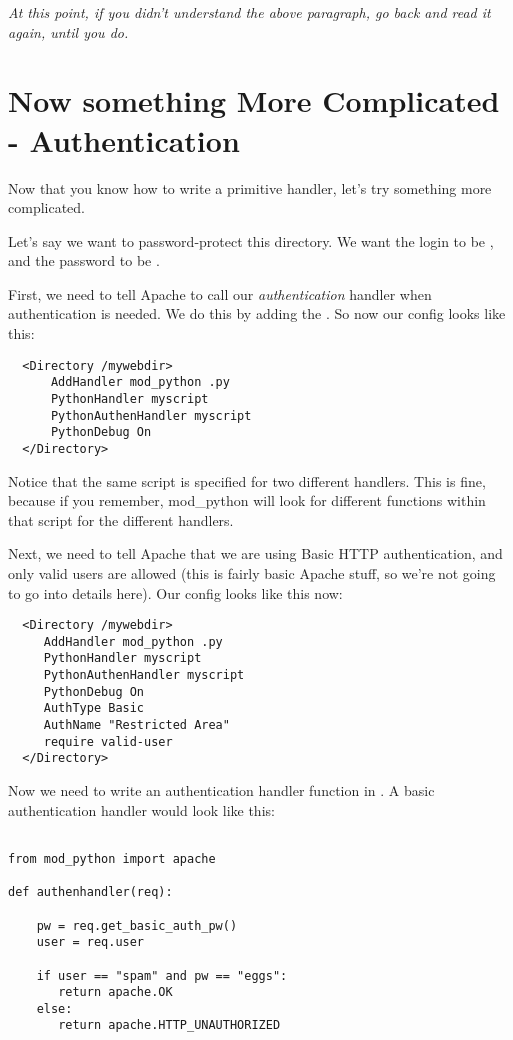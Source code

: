 \emph{At this point, if you didn't understand the above paragraph, go
  back and read it again, until you do.}

\section{Now something More Complicated - Authentication\label{tut-more-complicated}}

Now that you know how to write a primitive handler, let's try
something more complicated.

Let's say we want to password-protect this directory. We want the
login to be , and the password to be .

First, we need to tell Apache to call our \emph{authentication}
handler when authentication is needed. We do this by adding the
. So now our config looks like this:

\begin{verbatim}
  <Directory /mywebdir>
      AddHandler mod_python .py
      PythonHandler myscript
      PythonAuthenHandler myscript
      PythonDebug On
  </Directory>
\end{verbatim}

Notice that the same script is specified for two different
handlers. This is fine, because if you remember, mod_python will look
for different functions within that script for the different handlers.

Next, we need to tell Apache that we are using Basic HTTP
authentication, and only valid users are allowed (this is fairly basic
Apache stuff, so we're not going to go into details here). Our config
looks like this now:

\begin{verbatim}
  <Directory /mywebdir>
     AddHandler mod_python .py
     PythonHandler myscript
     PythonAuthenHandler myscript
     PythonDebug On
     AuthType Basic
     AuthName "Restricted Area"
     require valid-user
  </Directory>
\end{verbatim}          

Now we need to write an authentication handler function in
. A basic authentication handler would look like
this:

\begin{verbatim}

from mod_python import apache

def authenhandler(req):

    pw = req.get_basic_auth_pw()
    user = req.user

    if user == "spam" and pw == "eggs":
       return apache.OK
    else:
       return apache.HTTP_UNAUTHORIZED
\end{verbatim}  

